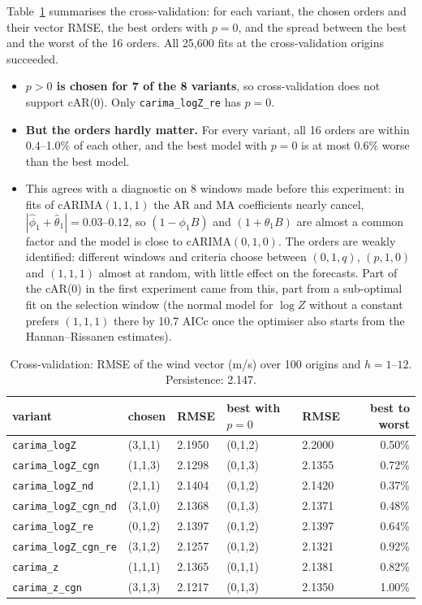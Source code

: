 \documentclass[11pt,a4paper]{article}
\newcommand{\code}[1]{\texttt{#1}}
\newcommand{\1}{\mathbf{1}}
\begin{document}
Table~\ref{tab:cv} summarises the cross-validation: for each variant, the chosen orders and their
vector RMSE, the best orders with $p = 0$, and the spread between the best and the worst of the 16
orders. All 25,600 fits at the cross-validation origins succeeded.
\begin{itemize}
  \item \textbf{$p > 0$ is chosen for 7 of the 8 variants}, so cross-validation does not support
    cAR(0). Only \code{carima\_logZ\_re} has $p = 0$.
  \item \textbf{But the orders hardly matter.} For every variant, all 16 orders are within 0.4--1.0\%
    of each other, and the best model with $p = 0$ is at most 0.6\% worse than the best model.
  \item This agrees with a diagnostic on 8 windows made before this experiment: in fits of
    cARIMA$(1,1,1)$ the AR and MA coefficients nearly cancel, $|\hat\phi_1 + \hat\theta_1| =
    0.03$--$0.12$, so $(1 - \phi_1 B)$ and $(1 + \theta_1 B)$ are almost a common factor and the
    model is close to cARIMA$(0,1,0)$. The orders are weakly identified: different windows and
    criteria choose between $(0,1,q)$, $(p,1,0)$ and $(1,1,1)$ almost at random, with little
    effect on the forecasts. Part of the cAR(0) in the first experiment came from this, part from
    a sub-optimal fit on the selection window (the normal model for $\log Z$ without a constant
    prefers $(1,1,1)$ there by 10.7 AICc once the optimiser also starts from the Hannan--Rissanen
    estimates).
\end{itemize}

\begin{table}[H]
  \centering
  \caption{Cross-validation: RMSE of the wind vector (m/s) over 100 origins and $h = 1$--$12$.
    Persistence: 2.147.}\label{tab:cv}
  \begin{tabular}{lllllr}
    \toprule
    variant & chosen & RMSE & best with $p = 0$ & RMSE & best to worst \\
    \midrule
    \code{carima\_logZ} & (3,1,1) & 2.1950 & (0,1,2) & 2.2000 & 0.50\% \\
    \code{carima\_logZ\_cgn} & (1,1,3) & 2.1298 & (0,1,3) & 2.1355 & 0.72\% \\
    \code{carima\_logZ\_nd} & (2,1,1) & 2.1404 & (0,1,2) & 2.1420 & 0.37\% \\
    \code{carima\_logZ\_cgn\_nd} & (3,1,0) & 2.1368 & (0,1,3) & 2.1371 & 0.48\% \\
    \code{carima\_logZ\_re} & (0,1,2) & 2.1397 & (0,1,2) & 2.1397 & 0.64\% \\
    \code{carima\_logZ\_cgn\_re} & (3,1,2) & 2.1257 & (0,1,2) & 2.1321 & 0.92\% \\
    \code{carima\_z} & (1,1,1) & 2.1365 & (0,1,1) & 2.1381 & 0.82\% \\
    \code{carima\_z\_cgn} & (3,1,3) & 2.1217 & (0,1,3) & 2.1350 & 1.00\% \\
    \bottomrule
  \end{tabular}
\end{table}
\end{document}
